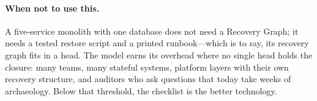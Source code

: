 \paragraph{When not to use this.}
A five-service monolith with one database does not need a Recovery Graph; it needs a tested restore script and a printed runbook---which is to say, its recovery graph fits in a head. The model earns its overhead where no single head holds the closure: many teams, many stateful systems, platform layers with their own recovery structure, and auditors who ask questions that today take weeks of archaeology. Below that threshold, the checklist is the better technology.
